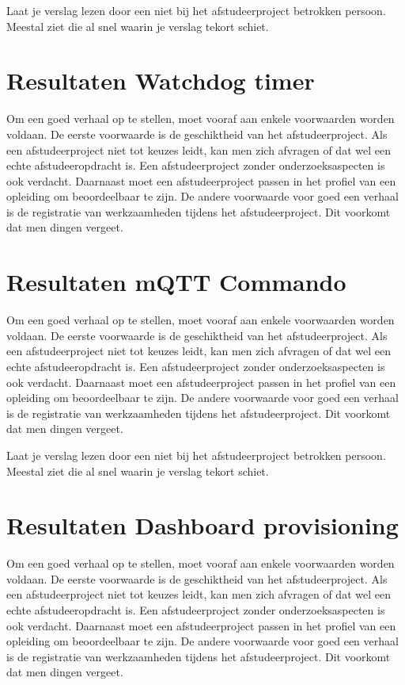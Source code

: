 		
		Laat je verslag lezen door een niet bij het afstudeerproject betrokken
		persoon. Meestal ziet die al snel waarin je verslag tekort schiet.
		\section{Resultaten  Watchdog timer}
		Om een goed verhaal op te stellen, moet vooraf aan enkele voorwaarden
		worden voldaan. De eerste voorwaarde is de geschiktheid van het
		afstudeerproject. Als een afstudeerproject niet tot keuzes leidt, kan
		men zich afvragen of dat wel een echte afstudeeropdracht is. Een
		afstudeerproject zonder onderzoeksaspecten is ook verdacht. Daarnaast
		moet een afstudeerproject passen in het profiel van een opleiding om
		beoordeelbaar te zijn. De andere voorwaarde voor goed een verhaal is
		de registratie van werkzaamheden tijdens het afstudeerproject. Dit
		voorkomt dat men dingen vergeet.
		
		\begin{center}
		\end{center}
		
		
		
		\section{Resultaten mQTT Commando}
		Om een goed verhaal op te stellen, moet vooraf aan enkele voorwaarden
		worden voldaan. De eerste voorwaarde is de geschiktheid van het
		afstudeerproject. Als een afstudeerproject niet tot keuzes leidt, kan
		men zich afvragen of dat wel een echte afstudeeropdracht is. Een
		afstudeerproject zonder onderzoeksaspecten is ook verdacht. Daarnaast
		moet een afstudeerproject passen in het profiel van een opleiding om
		beoordeelbaar te zijn. De andere voorwaarde voor goed een verhaal is
		de registratie van werkzaamheden tijdens het afstudeerproject. Dit
		voorkomt dat men dingen vergeet.
		
		
		Laat je verslag lezen door een niet bij het afstudeerproject betrokken
		persoon. Meestal ziet die al snel waarin je verslag tekort schiet.
		\section{Resultaten Dashboard provisioning}
		Om een goed verhaal op te stellen, moet vooraf aan enkele voorwaarden
		worden voldaan. De eerste voorwaarde is de geschiktheid van het
		afstudeerproject. Als een afstudeerproject niet tot keuzes leidt, kan
		men zich afvragen of dat wel een echte afstudeeropdracht is. Een
		afstudeerproject zonder onderzoeksaspecten is ook verdacht. Daarnaast
		moet een afstudeerproject passen in het profiel van een opleiding om
		beoordeelbaar te zijn. De andere voorwaarde voor goed een verhaal is
		de registratie van werkzaamheden tijdens het afstudeerproject. Dit
		voorkomt dat men dingen vergeet.
		

